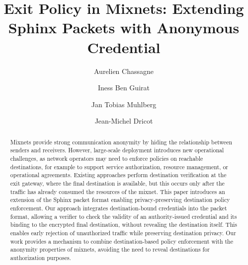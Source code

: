 \documentclass[sigconf,anonymous,review]{acmart}
\begin{document}
\title[Exit Policy in Mixnets]{Exit Policy in Mixnets: Extending Sphinx Packets with Anonymous Credential}


\author{Aurelien Chassagne}

\author{Iness Ben Guirat}

\author{Jan Tobias Muhlberg}

\author{Jean-Michel Dricot}



\renewcommand{\shortauthors}{Chassagne et al.}

\begin{abstract}
  Mixnets provide strong communication anonymity by hiding the relationship between senders and receivers. 
  However, large-scale deployment introduces new operational challenges, as network operators may need to enforce policies on reachable destinations, for example to support service authorization, resource management, or operational agreements. 
  Existing approaches perform destination verification at the exit gateway, where the final destination is available, but this occurs only after the traffic has already consumed the resources of the mixnet.
  This paper introduces an extension of the Sphinx packet format enabling privacy-preserving destination policy enforcement. 
  Our approach integrates destination-bound credentials into the packet format, allowing a verifier to check the validity of 
  an authority-issued credential and its binding to the encrypted final destination, without revealing the destination itself. 
  This enables early rejection of unauthorized traffic while preserving destination privacy.
  Our work provides a mechanism to combine destination-based policy enforcement with the anonymity properties of mixnets, avoiding the need to reveal destinations for authorization purposes.
\end{abstract}
\end{document}
